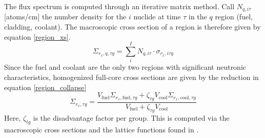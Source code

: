 The flux spectrum is computed through an iterative matrix method.  Call $N_{q,i\tau}$ [atoms/cm] 
the number density for the $i$ nuclide at time $\tau$ in the $q$ region 
(fuel, cladding, coolant).  The macroscopic cross section of a region is therefore given by equation 
\ref{region_xs}.
\begin{equation}
\label{region_xs}
\Sigma_{r_x,q,\tau g} = \sum_i^I N_{q,i\tau} \cdot \sigma_{r_x,i\tau g}
\end{equation}
Since the fuel and coolant are the only two regions with significant neutronic characteristics, 
homogenized full-core cross sections are given by the reduction in equation \ref{region_collapse}
\begin{equation}
\label{region_collapse}
\Sigma_{r_x,\tau g} = \frac{V_{\mbox{fuel}}\Sigma_{r_x,\mbox{fuel},\tau g} + \zeta_{\tau g}V_{\mbox{cool}}\Sigma_{r_x,\mbox{cool},\tau g}}
                           {V_{\mbox{fuel}} + \zeta_{\tau g}V_{\mbox{cool}}}
\end{equation}
Here, $\zeta_{tg}$ is the disadvantage factor per group.  This is computed via the macroscopic 
cross sections and the lattice functions found in \cite{Lamarsh2002}.  


